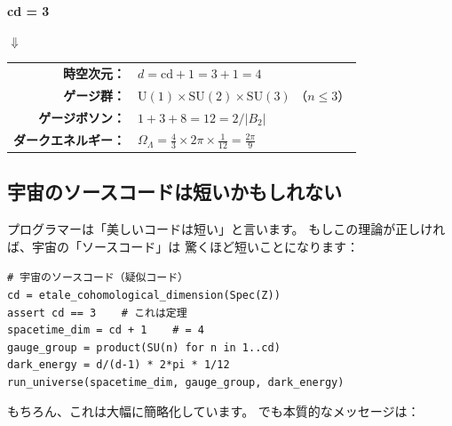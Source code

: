 \documentclass[12pt,a4paper]{article}
\begin{document}
\begin{wowbox}[cd = 3 から導かれるもの]
\begin{center}
\Large
\textbf{cd = 3}
\end{center}

\begin{center}
$\Downarrow$
\end{center}

\begin{center}
\begin{tabular}{rl}
\textbf{時空次元：} & $d = \mathrm{cd} + 1 = 3 + 1 = 4$ \\[6pt]
\textbf{ゲージ群：} & $\mathrm{U}(1) \times \mathrm{SU}(2) \times \mathrm{SU}(3)$
  （$n \le 3$） \\[6pt]
\textbf{ゲージボソン：} & $1 + 3 + 8 = 12 = 2/|B_2|$ \\[6pt]
\textbf{ダークエネルギー：} & $\displaystyle\Omega_\Lambda
  = \frac{4}{3}\times 2\pi \times \frac{1}{12} = \frac{2\pi}{9}$ \\
\end{tabular}
\end{center}
\end{wowbox}

\subsection{宇宙のソースコードは短いかもしれない}

プログラマーは「美しいコードは短い」と言います。
もしこの理論が正しければ、宇宙の「ソースコード」は
驚くほど短いことになります：

\begin{tcolorbox}[colback=black!90!white, colframe=black,
  colupper=green!70!white]
\texttt{\# 宇宙のソースコード（疑似コード）}\\[4pt]
\texttt{cd = etale\_cohomological\_dimension(Spec(Z))}\\
\texttt{assert cd == 3 ~~~\# これは定理}\\[4pt]
\texttt{spacetime\_dim = cd + 1 ~~~\# = 4}\\
\texttt{gauge\_group = product(SU(n) for n in 1..cd)}\\
\texttt{dark\_energy = d/(d-1) * 2*pi * 1/12}\\[4pt]
\texttt{run\_universe(spacetime\_dim, gauge\_group, dark\_energy)}
\end{tcolorbox}

もちろん、これは大幅に簡略化しています。
でも本質的なメッセージは：
\end{document}
